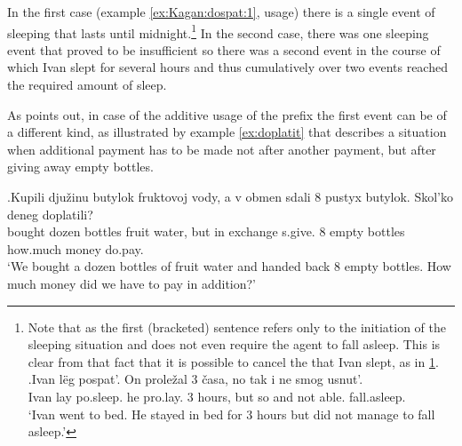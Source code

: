 In the first case (example \ref{ex:Kagan:dospat:1},  usage) there is a single event of sleeping that lasts until midnight.\footnote{Note that as the first (bracketed) sentence refers only to the initiation of the sleeping situation and does not even require the agent to fall asleep. This is clear from that fact that it is possible to cancel the  that Ivan slept, as in \ref{ex:dospat:no}.
\exg.\label{ex:dospat:no}Ivan l\"{e}g pospat'. On prole\v{z}al 3 \v{c}asa, no tak i ne smog usnut'.\\
Ivan lay po.sleep. he pro.lay. 3 hours, but so and not able. fall.asleep.\\
\trans `Ivan went to bed. He stayed in bed for 3 hours but did not manage to fall asleep.'

} In the second case, there was one sleeping event that proved to be insufficient so there was a second event in the course of which Ivan slept for several hours and thus cumulatively over two events reached the required amount of sleep. 

As \citet[80]{Kagan:book} points out, in case of the additive usage of the prefix  the first event can be of a different kind, as illustrated by example \ref{ex:doplatit} that describes a situation when additional payment has to be made not after another payment, but after giving away empty bottles.

\exg.\label{ex:doplatit}Kupili dju\v{z}inu butylok fruktovoj vody, a v obmen sdali 8 pustyx butylok. Skol'ko deneg doplatili?\\
bought dozen bottles fruit water, but in exchange s.give. 8 empty bottles how.much money do.pay.\\
\trans `We bought a dozen bottles of fruit water and handed back 8 empty bottles. How much money did we have to pay in addition?'


